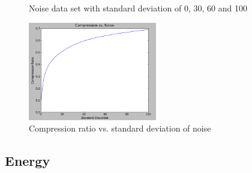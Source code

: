 \begin{figure}[ht]
\centering
{}
\hfill
{}
\hfill
{}
\hfill
{}
\caption{Noise data set with standard deviation of 0, 30, 60 and 100}
\label{fig:noiseset}
\end{figure}  

\begin{figure}[h]
  \centering
  \includegraphics[width=0.50\textwidth]{figures/noiseall.png} 
  \caption{Compression ratio vs. standard deviation of noise}
  \label{fig:noiseall}
\end{figure}

\subsection{Energy}

